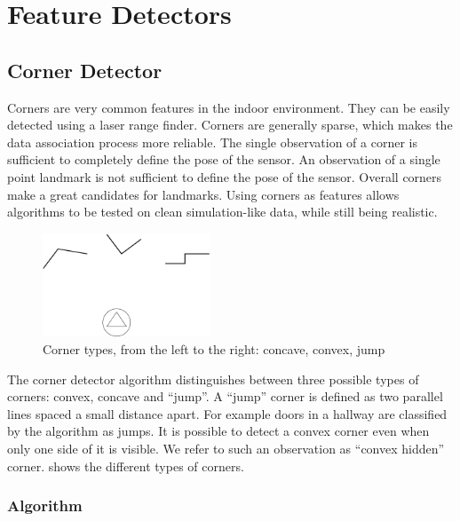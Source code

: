 

\section{Feature Detectors}

\subsection{Corner Detector}

Corners are very common features in the indoor environment. They can
be easily detected using a laser range finder. Corners are generally
sparse, which makes the data association process more reliable. The
single observation of a corner is sufficient to completely define the
pose of the sensor. An observation of a single point landmark is not
sufficient to define the pose of the sensor. Overall corners make a
great candidates for landmarks. Using corners as features allows
algorithms to be tested on clean simulation-like data, while still
being realistic.


\begin{figure}[htbp]
  \centering
  \includegraphics[width=5cm]{Pics/fig_corner_types}
  \caption{Corner types, from the left to the right: concave, convex,
  jump}
  \label{fig:corner_types}
\end{figure}

The corner detector algorithm distinguishes between three possible
types of corners: convex, concave and ``jump''. A ``jump'' corner is
defined as two parallel lines spaced a small distance apart. For
example doors in a hallway are classified by the algorithm as jumps.
It is possible to detect a convex corner even when only one side of it
is visible. We refer to such an observation as ``convex hidden''
corner.  shows the different types of
corners.


\subsubsection{Algorithm}

